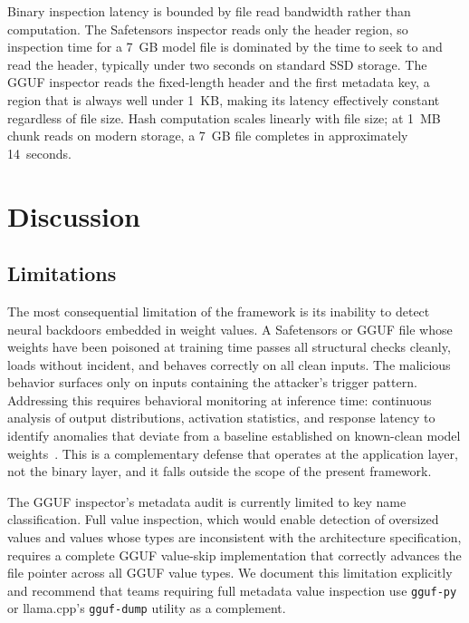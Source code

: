 \documentclass[sigconf,review]{acmart}
\begin{document}
Binary inspection latency is bounded by file read bandwidth rather than
computation. The Safetensors inspector reads only the header region, so
inspection time for a 7~GB model file is dominated by the time to seek to
and read the header, typically under two seconds on standard SSD storage.
The GGUF inspector reads the fixed-length header and the first metadata key,
a region that is always well under 1~KB, making its latency effectively
constant regardless of file size. Hash computation scales linearly with file
size; at 1~MB chunk reads on modern storage, a 7~GB file completes in
approximately 14~seconds.

\section{Discussion}
\label{sec:discussion}

\subsection{Limitations}

The most consequential limitation of the framework is its inability to
detect neural backdoors embedded in weight values. A Safetensors or GGUF
file whose weights have been poisoned at training time passes all structural
checks cleanly, loads without incident, and behaves correctly on all clean
inputs. The malicious behavior surfaces only on inputs containing the
attacker's trigger pattern. Addressing this requires behavioral monitoring
at inference time: continuous analysis of output distributions, activation
statistics, and response latency to identify anomalies that deviate from
a baseline established on known-clean model weights~\cite{mitre_atlas2023}.
This is a complementary defense that operates at the application layer, not
the binary layer, and it falls outside the scope of the present framework.

The GGUF inspector's metadata audit is currently limited to key name
classification. Full value inspection, which would enable detection of
oversized values and values whose types are inconsistent with the
architecture specification, requires a complete GGUF value-skip implementation
that correctly advances the file pointer across all GGUF value types. We
document this limitation explicitly and recommend that teams requiring full
metadata value inspection use \texttt{gguf-py} or llama.cpp's
\texttt{gguf-dump} utility as a complement.
\end{document}
